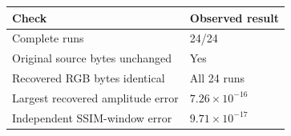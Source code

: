 \begin{center}
{\small
\setlength{\tabcolsep}{4pt}
\begin{tabular}{@{}ll@{}}
\toprule
Check & Observed result \\
\midrule
Complete runs & 24/24 \\
Original source bytes unchanged & Yes \\
Recovered RGB bytes identical & All 24 runs \\
Largest recovered amplitude error & $7.26\times10^{-16}$ \\
Independent SSIM-window error & $9.71\times10^{-17}$ \\
\bottomrule
\end{tabular}}
\end{center}
